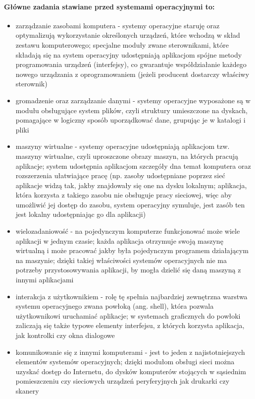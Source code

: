 \documentclass[]{report}
\begin{document}
\paragraph{Główne zadania stawiane przed systemami operacyjnymi to:}
\begin{itemize}
\item zarządzanie zasobami komputera - systemy operacyjne staruję oraz optymalizują wykorzystanie określonych urządzeń, które wchodzą w skład zestawu komputerowego; specjalne moduły zwane sterownikami, które składają się na system operacyjny udostępniają aplikacjom spójne metody programowania urządzeń (interfejsy), co gwarantuje współdziałanie każdego nowego urządzania z oprogramowaniem (jeżeli producent dostarczy właściwy sterownik)
\item gromadzenie oraz zarządzanie danymi - systemy operacyjne wyposażone są w modułu obsługujące system plików, czyli struktury umieszczone na dyskach, pomagające w logiczny sposób uporządkować dane, grupując je w katalogi i pliki
\item maszyny wirtualne - systemy operacyjne udostępniają aplikacjom tzw. maszyny wirtualne, czyli uproszczone obrazy maszyn, na których pracują aplikacje; system udostępnia aplikacjom szczegóły dna temat komputera oraz rozszerzenia ułatwiające pracę (np. zasoby udostępniane poprzez sieć aplikacje widzą tak, jakby znajdowały się one na dysku lokalnym; aplikacja, która korzysta z takiego zasobu nie obsługuje pracy sieciowej, więc aby umożliwić jej dostęp do zasobu, system operacyjny symuluje, jest zasób ten jest lokalny udostępniając go dla aplikacji)
\item wielozadaniowość - na pojedynczym komputerze funkcjonować może wiele aplikacji w jednym czasie; każda aplikacja otrzymuje swoją maszynę wirtualną i może pracować jakby była pojedynczym programem działającym na maszynie; dzięki takiej właściwości systemów operacyjnych nie ma potrzeby przystosowywania aplikacji, by mogła dzielić się daną maszyną z innymi aplikacjami
\item interakcja z użytkownikiem - rolę tę spełnia najbardziej zewnętrzna warstwa systemu operacyjnego zwana powłoką (ang. shell), która pozwala użytkownikowi uruchamiać aplikacje; w systemach graficznych do powłoki zaliczają się także typowe elementy interfejsu, z których korzysta aplikacja, jak kontrolki czy okna dialogowe
\item komunikowanie się z innymi komputerami - jest to jeden z najistotniejszych elementów systemów operacyjnych; dzięki modułom obsługi sieci można uzyskać dostęp do Internetu, do dysków komputerów stojących w sąsiednim pomieszczeniu czy sieciowych urządzeń peryferyjnych jak drukarki czy skanery
\end{itemize}
\end{document}
